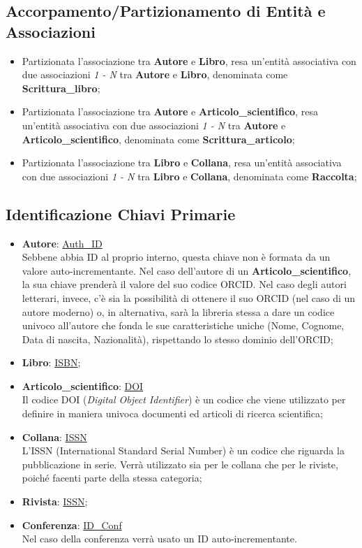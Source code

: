 \documentclass[a4paper, 15pt, oneside]{article}
\begin{document}
	\subsection{Accorpamento/Partizionamento di Entità e Associazioni}
	\begin{itemize}
		\item Partizionata l'associazione tra \textbf{Autore} e \textbf{Libro}, resa un'entità associativa con due associazioni \textit{1 - N} tra \textbf{Autore} e \textbf{Libro}, denominata come \textbf{Scrittura\_libro};
		\item Partizionata l'associazione tra \textbf{Autore} e \textbf{Articolo\_scientifico}, resa un'entità associativa con due associazioni \textit{1 - N} tra \textbf{Autore} e \textbf{Articolo\_scientifico}, denominata come \textbf{Scrittura\_articolo};
		\item Partizionata l'associazione tra \textbf{Libro} e \textbf{Collana}, resa un'entità associativa con due associazioni \textit{1 - N} tra \textbf{Libro} e \textbf{Collana}, denominata come \textbf{Raccolta};
	\end{itemize}
	\subsection{Identificazione Chiavi Primarie}
	\begin{itemize}
		\item \textbf{Autore}: \underline{Auth\_ID}\\Sebbene abbia ID al proprio interno, questa chiave non è formata da un valore auto-incrementante. Nel caso dell'autore di un \textbf{Articolo\_scientifico}, la sua chiave prenderà il valore del suo codice ORCID. Nel caso degli autori letterari, invece, c'è sia la possibilità di ottenere il suo ORCID (nel caso di un autore moderno) o, in alternativa, sarà la libreria stessa a dare un codice univoco all'autore che fonda le sue caratteristiche uniche (Nome, Cognome, Data di nascita, Nazionalità), rispettando lo stesso dominio dell'ORCID;
		\item \textbf{Libro}: \underline{ISBN};
		\item \textbf{Articolo\_scientifico}: \underline{DOI}\\Il codice DOI (\textit{Digital Object Identifier}) è un codice che viene utilizzato per definire in maniera univoca documenti ed articoli di ricerca scientifica;
		\item \textbf{Collana}: \underline{ISSN}\\L'ISSN (International Standard Serial Number) è un codice che riguarda la pubblicazione in serie. Verrà utilizzato sia per le collana che per le riviste, poiché facenti parte della stessa categoria;
		\item \textbf{Rivista}: \underline{ISSN};
		\item \textbf{Conferenza}: \underline{ID\_Conf}\\Nel caso della conferenza verrà usato un ID auto-incrementante.
	\end{itemize}
	\newpage
\end{document}
